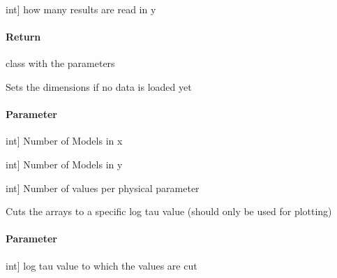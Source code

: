 \documentclass[letterpaper,10pt,english]{sphinxmanual}
\begin{document}
\begin{fulllineitems}
\begin{fulllineitems}
\begin{description}
\sphinxlineitem{ny}{[}int{]}
\sphinxAtStartPar
how many results are read in y

\end{description}


\paragraph{Return}
\label{\detokenize{classes:id5}}
\sphinxAtStartPar
class with the parameters

\end{fulllineitems}


\begin{fulllineitems}
\label{\detokenize{classes:model.Model.set_dim}}
\pysigstartsignatures
{}
\pysigstopsignatures
\sphinxAtStartPar
Sets the dimensions if no data is loaded yet


\paragraph{Parameter}
\label{\detokenize{classes:id6}}\begin{description}
\sphinxlineitem{nx}{[}int{]}
\sphinxAtStartPar
Number of Models in x

\sphinxlineitem{ny}{[}int{]}
\sphinxAtStartPar
Number of Models in y

\sphinxlineitem{npars}{[}int{]}
\sphinxAtStartPar
Number of values per physical parameter

\end{description}

\end{fulllineitems}


\begin{fulllineitems}
\label{\detokenize{classes:model.Model.set_limit}}
\pysigstartsignatures
{}
\pysigstopsignatures
\sphinxAtStartPar
Cuts the arrays to a specific log tau value (should only be used for plotting)


\paragraph{Parameter}
\label{\detokenize{classes:id7}}\begin{description}
\sphinxlineitem{lim}{[}int{]}
\sphinxAtStartPar
log tau value to which the values are cut


\end{description}
\end{fulllineitems}
\end{fulllineitems}
\end{document}
